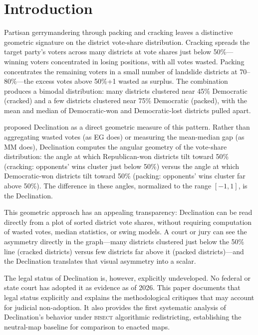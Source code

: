 \section{Introduction}
\label{sec:introduction}

Partisan gerrymandering through packing and cracking leaves a distinctive geometric
signature on the district vote-share distribution. Cracking spreads the target party's
voters across many districts at vote shares just below 50\%---winning voters concentrated
in losing positions, with all votes wasted. Packing concentrates the remaining voters in
a small number of landslide districts at 70--80\%---the excess votes above 50\%+1 wasted
as surplus. The combination produces a bimodal distribution: many districts clustered near
45\% Democratic (cracked) and a few districts clustered near 75\% Democratic (packed),
with the mean and median of Democratic-won and Democratic-lost districts pulled apart.

\citet{warrington2018} proposed Declination as a direct geometric measure of this pattern.
Rather than aggregating wasted votes (as EG does) or measuring the mean-median gap (as MM
does), Declination computes the angular geometry of the vote-share distribution: the angle
at which Republican-won districts tilt toward 50\% (cracking: opponents' wins cluster just
below 50\%) versus the angle at which Democratic-won districts tilt toward 50\% (packing:
opponents' wins cluster far above 50\%). The difference in these angles, normalized to the
range $[-1, 1]$, is the Declination.

This geometric approach has an appealing transparency: Declination can be read directly
from a plot of sorted district vote shares, without requiring computation of wasted votes,
median statistics, or swing models. A court or jury can see the asymmetry directly in the
graph---many districts clustered just below the 50\% line (cracked districts) versus few
districts far above it (packed districts)---and the Declination translates that visual
asymmetry into a scalar.

The legal status of Declination is, however, explicitly undeveloped. No federal or state
court has adopted it as evidence as of 2026. This paper documents that legal status
explicitly and explains the methodological critiques that may account for judicial
non-adoption. It also provides the first systematic analysis of Declination's behavior
under \textsc{bisect} algorithmic redistricting, establishing the neutral-map baseline
for comparison to enacted maps.

